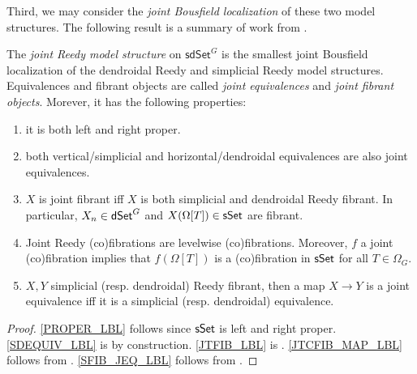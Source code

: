 \documentclass[a4paper,10pt
,draft
]{article}%
\renewcommand{\1}{\eta}%
\begin{document}
Third, we may consider the \textit{joint Bousfield localization} of these two model structures.
The following result is a summary of work from \cite[\S 4.1]{BP_edss}.
\begin{theorem}
      \label{JB_THM}
      The \textit{joint Reedy model structure} on $\mathsf{sdSet}^G$ is the smallest joint Bousfield localization of the dendroidal Reedy and simplicial Reedy model structures.
      Equivalences and fibrant objects are called \textit{joint equivalences} and \textit{joint fibrant objects}.
      Morever, it has the following properties:
      \begin{enumerate}[label = (\roman*)]
      \item \label{PROPER_LBL} it is both left and right proper.
      \item \label{SDEQUIV_LBL} both vertical/simplicial and horizontal/dendroidal equivalences are also joint equivalences.
      \item \label{JTFIB_LBL} $X$ is joint fibrant iff $X$ is both simplicial and dendroidal Reedy fibrant.
            In particular, $X_n \in \mathsf{dSet}^G$ and $X(\Omega[T]) \in \mathsf{sSet}$ are fibrant.
      \item \label{JTCFIB_MAP_LBL} Joint Reedy (co)fibrations are levelwise (co)fibrations.
            Moreover, $f$ a joint (co)fibration implies that $f(\Omega[T])$ is a (co)fibration in $\mathsf{sSet}$ for all $T \in \Omega_G$.
      \item \label{SFIB_JEQ_LBL} $X,Y$ simplicial (resp. dendroidal) Reedy fibrant, then a map $X \to Y$ is a joint equivalence iff it is a simplicial (resp. dendroidal) equivalence.
      \end{enumerate}
\end{theorem}
\begin{proof}
      \ref{PROPER_LBL} follows since $\mathsf{sSet}$ is left and right proper.
      \ref{SDEQUIV_LBL} is by construction.
      \ref{JTFIB_LBL} is \cite[Prop. 4.1(ii)]{BP_edss}.
      \ref{JTCFIB_MAP_LBL} follows from \cite[Lemmas A.27, A.29]{BP_edss}.
      \ref{SFIB_JEQ_LBL} follows from \cite[Prop. 4.5(iii), Cor. 4.29(iii)]{BP_edss}.      
\end{proof}
\end{document}
